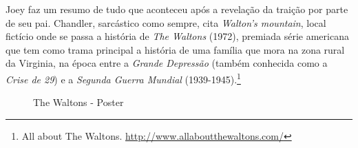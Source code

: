 \saveparinfos
\noindent
\begin{minipage}[c]{0.5\textwidth}\useparinfo

Joey faz um resumo de tudo que aconteceu após a revelação da traição por
parte de seu pai. Chandler, sarcástico como sempre, cita \emph{Walton's
mountain}, local fictício onde se passa a história de \emph{The Waltons}
(1972), premiada série americana que tem como trama principal a história
de uma família que mora na zona rural da Virginia, na época entre a
\emph{Grande Depressão} (também conhecida como a \emph{Crise de 29}) e a
\emph{Segunda Guerra Mundial} (1939-1945).\footnote{\sloppy All about The Waltons. \url{http://www.allaboutthewaltons.com/}}

\end{minipage}\hfill
\begin{minipage}[c]{0.5\textwidth}

\begin{figure}
  \centering
    \caption{The Waltons - Poster\label{fig:the-waltons-poster}}
\end{figure}

\end{minipage}
